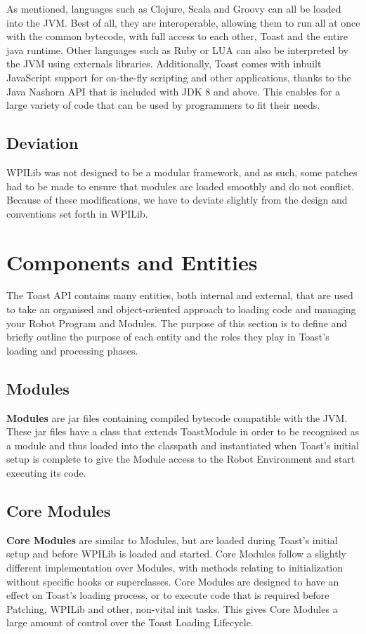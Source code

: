 \documentclass[a4paper,12pt]{article}
\begin{document}
As mentioned, languages such as Clojure, Scala and Groovy can all be loaded into the JVM. Best of all, they are interoperable, allowing them to run all at once with the common bytecode, with full access to each other, Toast and the entire java runtime. Other languages such as Ruby or LUA can also be interpreted by the JVM using externals libraries. Additionally, Toast comes with inbuilt JavaScript support for on-the-fly scripting and other applications, thanks to the Java Nashorn API that is included with JDK 8 and above. This enables for a large variety of code that can be used by programmers to fit their needs.

\subsection{Deviation}
WPILib was not designed to be a modular framework, and as such, some patches had to be made to ensure that modules are loaded smoothly and do not conflict. Because of these modifications, we have to deviate slightly from the design and conventions set forth in WPILib.

\newpage

\section{Components and Entities}
The Toast API contains many entities, both internal and external, that are used to take an organised and object-oriented approach to loading code and managing your Robot Program and Modules. The purpose of this section is to define and briefly outline the purpose of each entity and the roles they play in Toast's loading and processing phases.

\subsection{Modules}
\textbf{Modules} are jar files containing compiled bytecode compatible with the JVM. These jar files have a class that extends ToastModule in order to be recognised as a module and thus loaded into the classpath and instantiated when Toast's initial setup is complete to give the Module access to the Robot Environment and start executing its code.

\subsection{Core Modules}
\textbf{Core Modules} are similar to Modules, but are loaded during Toast's initial setup and before WPILib is loaded and started. Core Modules follow a slightly different implementation over Modules, with methods relating to initialization without specific hooks or superclasses. Core Modules are designed to have an effect on Toast's loading process, or to execute code that is required before Patching, WPILib and other, non-vital init tasks. This gives Core Modules a large amount of control over the Toast Loading Lifecycle. 
\end{document}
